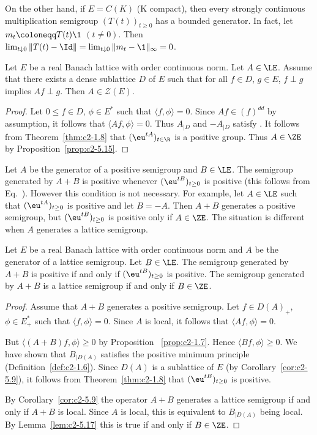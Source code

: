 On the other hand, if\/ $E = C(K)$ (K compact), then every strongly continuous multiplication semigroup $(T(t))_{t \geq 0}$ has a bounded generator.
In fact, let $m_t \coloneqq T(t)\1$ $(t \neq 0)$.
Then $\lim_{t \downarrow 0}\|T(t) - \Id\| =    \lim_{t \downarrow 0}\|m_t - \1\|_{\infty} = 0$.
\begin{lemma}\label{lem:c2-5.17}
%
Let $E$ be a real Banach lattice with order continuous norm.
Let $A \in \LE$.
Assume that there exists a dense sublattice $D$ of\/ $E$ such that for all $f \in D$, $g \in E$, $f \perp g$ implies $Af \perp g$.
Then $A \in \mathcal{Z}(E)$.
\end{lemma}
\begin{proof}
Let $0 \leq f \in D$, $\phi \in E^*$ such that $\langle f,\phi \rangle = 0$.
Since $Af \in (f)^{dd}$ by assumption, it follows that $\langle Af,\phi \rangle = 0$.
Thus $A_{\vert D }$ and $-A_{\vert D}$ satisfy .
It follows from Theorem~\ref{thm:c2-1.8}    that $(\eu^{tA})_{t \in \R}$ is a positive group.
Thus $A \in \ZE$ by  Proposition~\ref{prop:c2-5.15}.
\end{proof}
Let $A$ be the generator of a positive semigroup and $B \in \LE$. 
The semigroup generated by $A + B$ is positive whenever $(\eu^{tB})_{t \geq 0}$ is positive (this follows from Eq.~).
However this condition is not necessary. 
For example, let $A \in \LE$ such that $(\eu^{tA})_{t \geq 0}$ is positive and let $B = -A$.
Then $A + B$ generates a positive semigroup, but $(\eu^{tB})_{t \geq 0}$ is positive only if\/ $A \in \ZE$.
The situation is different when $A$ generates a lattice semigroup.
\begin{theorem}\label{thm:c2-5.18}
Let $E$ be a real Banach lattice with order continuous norm and $A$ be the generator of a lattice semigroup.
Let $B \in \LE$.
The semigroup generated by $A + B$ is positive if and only if\/ $(\eu^{tB})_{t \geq 0}$ is positive.
The semigroup generated by $A + B$ is a lattice semigroup if and only if\/ $B \in \ZE$.
\end{theorem}
\begin{proof}
Assume that $A + B$ generates a positive semigroup.
Let $f \in D(A)_{+}$, $\phi \in E_{+}^*$ such that $\langle f,\phi \rangle = 0$.
Since $A$ is local, it follows that $\langle Af,\phi \rangle = 0$.

But $\langle (A+B)f,\phi \rangle \geq 0$ by  Proposition ~\ref{prop:c2-1.7}.
Hence $\langle Bf,\phi \rangle \geq 0$.
We have shown that $B_{\vert D(A)}$ satisfies the positive minimum principle (Definition~\ref{def:c2-1.6}).
Since $D(A)$ is a sublattice of\/ $E$ (by Corollary~\ref{cor:c2-5.9}), it follows from Theorem~\ref{thm:c2-1.8}   that $(\eu^{tB})_{t \geq 0}$ is positive.

By Corollary~\ref{cor:c2-5.9} the operator $A + B$ generates a lattice semigroup if and only if\/ $A + B$ is local.
Since $A$ is local, this is equivalent to $B_{\vert D(A)}$ being local.
By Lemma~\ref{lem:c2-5.17} this is true if and only if\/ $B \in \ZE$.
\end{proof}
